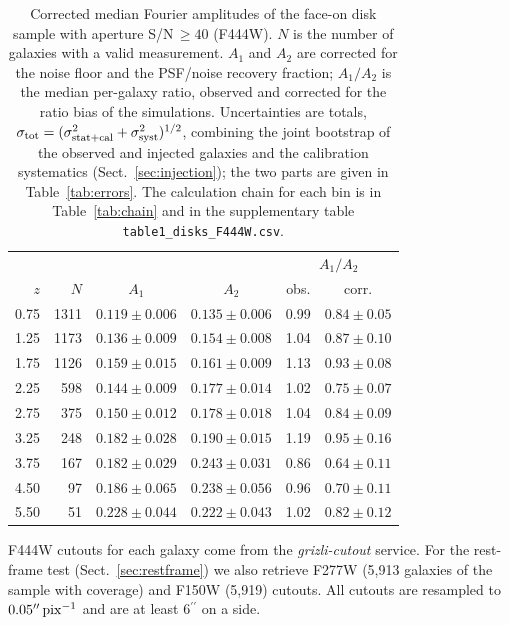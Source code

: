 \documentclass[fleqn,usenatbib]{mnras}
\providecommand{\arcsec}{\ensuremath{^{\prime\prime}}}
\begin{document}
\begin{table}
\centering
\caption{Corrected median Fourier amplitudes of the face-on disk
sample with aperture S/N$\,\geq40$ (F444W). $N$ is the number of galaxies with a
valid measurement.
$A_1$ and $A_2$ are corrected for the noise floor and the PSF/noise
recovery fraction; $A_1/A_2$ is the median per-galaxy ratio, observed and
corrected for the ratio bias of the simulations. Uncertainties are
totals, $\sigma_{\rm tot}=(\sigma_{\rm stat+cal}^2+\sigma_{\rm
syst}^2)^{1/2}$, combining the joint bootstrap of the observed and
injected galaxies and the calibration systematics
(Sect.~\ref{sec:injection}); the two parts are given in
Table~\ref{tab:errors}. The calculation chain for each bin is in
Table~\ref{tab:chain} and in the supplementary table
\texttt{table1\_disks\_F444W.csv}.}
\label{tab:main}
\footnotesize
\setlength{\tabcolsep}{3.5pt}
\begin{tabular}{rrcccc}
\hline
 & & & & \multicolumn{2}{c}{$A_1/A_2$}\\
$z$ & $N$ & $A_1$ & $A_2$ & obs. & corr.\\
\hline
0.75 & 1311 & $0.119\pm0.006$ & $0.135\pm0.006$ & 0.99 & $0.84\pm0.05$\\
1.25 & 1173 & $0.136\pm0.009$ & $0.154\pm0.008$ & 1.04 & $0.87\pm0.10$\\
1.75 & 1126 & $0.159\pm0.015$ & $0.161\pm0.009$ & 1.13 & $0.93\pm0.08$\\
2.25 & 598 & $0.144\pm0.009$ & $0.177\pm0.014$ & 1.02 & $0.75\pm0.07$\\
2.75 & 375 & $0.150\pm0.012$ & $0.178\pm0.018$ & 1.04 & $0.84\pm0.09$\\
3.25 & 248 & $0.182\pm0.028$ & $0.190\pm0.015$ & 1.19 & $0.95\pm0.16$\\
3.75 & 167 & $0.182\pm0.029$ & $0.243\pm0.031$ & 0.86 & $0.64\pm0.11$\\
4.50 & 97 & $0.186\pm0.065$ & $0.238\pm0.056$ & 0.96 & $0.70\pm0.11$\\
5.50 & 51 & $0.228\pm0.044$ & $0.222\pm0.043$ & 1.02 & $0.82\pm0.12$\\
\hline
\end{tabular}
\end{table}

F444W cutouts for each galaxy come from the \textit{grizli-cutout} service.
For the rest-frame test (Sect.~\ref{sec:restframe}) we also retrieve F277W
(5{,}913 galaxies of the sample with coverage) and F150W (5{,}919) cutouts. All cutouts are resampled to $0.05\arcsec\,{\rm pix}^{-1}$ and are at
least $6\arcsec$ on a side.
\end{document}
